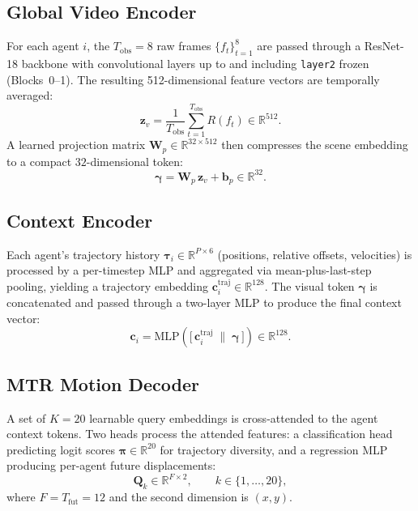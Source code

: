 \documentclass[11pt,a4paper]{article}
\begin{document}
\subsection{Global Video Encoder}
For each agent $i$, the $T_{\mathrm{obs}}=8$ raw frames $\{f_t\}_{t=1}^{8}$ are passed through a ResNet-18 backbone with convolutional layers up to and including \texttt{layer2} frozen (Blocks~0--1).  The resulting 512-dimensional feature vectors are temporally averaged:
\begin{equation}
\mathbf{z}_v = \frac{1}{T_{\mathrm{obs}}}\sum_{t=1}^{T_{\mathrm{obs}}} R\!\left(f_t\right) \in \mathbb{R}^{512}.
\label{eq:global_pool}
\end{equation}
A learned projection matrix $\mathbf{W}_p \in \mathbb{R}^{32 \times 512}$ then compresses the scene embedding to a compact $32$-dimensional token:
\begin{equation}
\boldsymbol{\gamma} = \mathbf{W}_p\,\mathbf{z}_v + \mathbf{b}_p \in \mathbb{R}^{32}.
\label{eq:proj}
\end{equation}

\subsection{Context Encoder}
Each agent's trajectory history $\boldsymbol{\tau}_i \in \mathbb{R}^{P \times 6}$ (positions, relative offsets, velocities) is processed by a per-timestep MLP and aggregated via mean-plus-last-step pooling, yielding a trajectory embedding $\mathbf{c}_i^{\mathrm{traj}} \in \mathbb{R}^{128}$.  The visual token $\boldsymbol{\gamma}$ is concatenated and passed through a two-layer MLP to produce the final context vector:
\begin{equation}
\mathbf{c}_i = \mathrm{MLP}\!\left(\bigl[\,\mathbf{c}_i^{\mathrm{traj}}\;\|\;\boldsymbol{\gamma}\,\bigr]\right) \in \mathbb{R}^{128}.
\label{eq:ctx}
\end{equation}

\subsection{MTR Motion Decoder}
A set of $K=20$ learnable query embeddings is cross-attended to the agent context tokens.  Two heads process the attended features: a classification head predicting logit scores $\boldsymbol{\pi} \in \mathbb{R}^{20}$ for trajectory diversity, and a regression MLP producing per-agent future displacements:
\[
\mathbf{Q}_k \in \mathbb{R}^{F \times 2}, \qquad k \in \{1,\dots,20\},
\]
where $F = T_{\mathrm{fut}} = 12$ and the second dimension is $(x,y)$.
\end{document}
